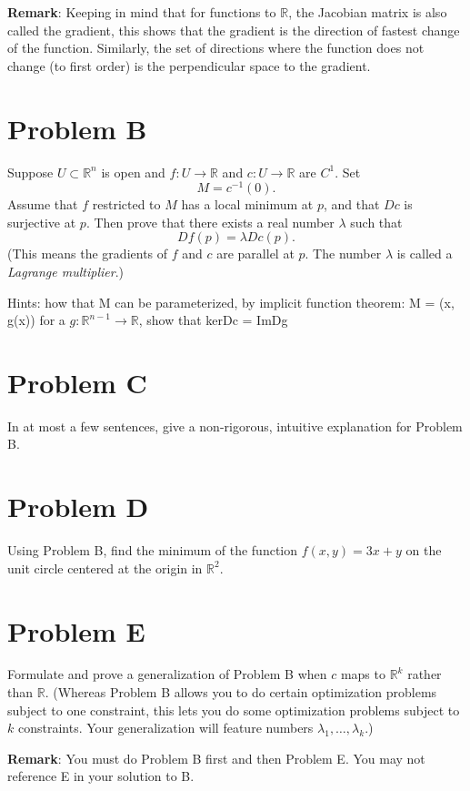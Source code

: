 \documentclass[lang=en,11pt]{template}
\begin{document}
\textbf{Remark}: Keeping in mind that for functions to $\mathbb{R}$, the Jacobian matrix is also called the gradient, this shows that the gradient is the direction of fastest change of the function. Similarly, the set of directions where the function does not change (to first order) is the perpendicular space to the gradient.

\section*{Problem B}
Suppose $U \subset \mathbb{R}^n$ is open and $f : U \to \mathbb{R}$ and $c : U \to \mathbb{R}$ are $C^1$. Set
\[
M = c^{-1}(0).
\]
Assume that $f$ restricted to $M$ has a local minimum at $p$, and that $Dc$ is surjective at $p$. Then prove that there exists a real number $\lambda$ such that
\[
Df(p) = \lambda Dc(p).
\]
(This means the gradients of $f$ and $c$ are parallel at $p$. The number $\lambda$ is called a \textit{Lagrange multiplier}.)

Hints: how that M can be parameterized, by implicit function theorem: M = {(x, g(x))} for a $g: \mathbb{R}^{n-1} \rightarrow \mathbb{R}$, show that kerDc = ImDg


\section*{Problem C}
In at most a few sentences, give a non-rigorous, intuitive explanation for Problem B.

\section*{Problem D}
Using Problem B, find the minimum of the function $f(x, y) = 3x + y$ on the unit circle centered at the origin in $\mathbb{R}^2$.

\section*{Problem E}
Formulate and prove a generalization of Problem B when $c$ maps to $\mathbb{R}^k$ rather than $\mathbb{R}$. (Whereas Problem B allows you to do certain optimization problems subject to one constraint, this lets you do some optimization problems subject to $k$ constraints. Your generalization will feature numbers $\lambda_1, \dots, \lambda_k$.)

\textbf{Remark}: You must do Problem B first and then Problem E. You may not reference E in your solution to B.
\end{document}
